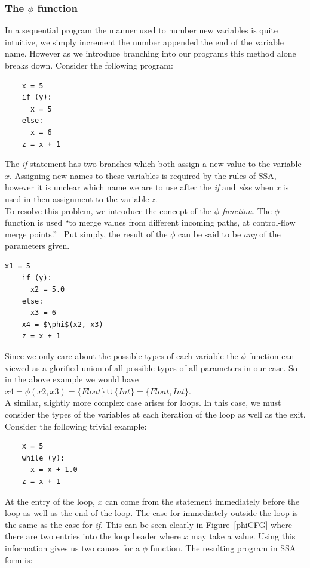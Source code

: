 \documentclass[12pt, titlepage]{article}
\begin{document}
\subsubsection{The $\phi$ function}
In a sequential program the manner used to number new variables is quite intuitive, we simply increment the number appended the end of the variable name. However as we introduce branching into our programs this method alone breaks down. Consider the following program:
\begin{lstlisting}
    x = 5
    if (y):
      x = 5
    else:
      x = 6
    z = x + 1
\end{lstlisting}
The \textit{if} statement has two branches which both assign a new value to the variable $x$. Assigning new names to these variables is required by the rules of SSA, however it is unclear which name we are to use after the \textit{if} and \textit{else} when \textit{x} is used in then assignment to the variable \textit{z}. \\
To resolve this problem, we introduce the concept of the \emph{$\phi$ function}. The $\phi$ function is used ``to merge values from different incoming paths, at control-flow merge points.''~\cite{ssaBook} Put simply, the result of the $\phi$ can be said to be \emph{any} of the parameters given. 
\begin{lstlisting}[mathescape]
    x1 = 5
    if (y):
      x2 = 5.0
    else:
      x3 = 6
    x4 = $\phi$(x2, x3)
    z = x + 1
\end{lstlisting}
Since we only care about the possible types of each variable the $\phi$ function can viewed as a glorified union of all possible types of all parameters in our case. So in the above example we would have $x4 = \phi(x2, x3) = \{Float\} \cup \{Int\} = \{Float, Int\}$. \\
A similar, slightly more complex case arises for loops. In this case, we must consider the types of the variables at each iteration of the loop as well as the exit. Consider the following trivial example:
\begin{lstlisting}
    x = 5
    while (y):
      x = x + 1.0
    z = x + 1
\end{lstlisting}
At the entry of the loop, $x$ can come from the statement immediately before the loop as well as the end of the loop. The case for immediately outside the loop is the same as the case for \textit{if}. This can be seen clearly in Figure~\ref{phiCFG} where there are two entries into the loop header where $x$ may take a value. Using this information gives us two causes for a $\phi$ function. The resulting program in SSA form is:
\end{document}
